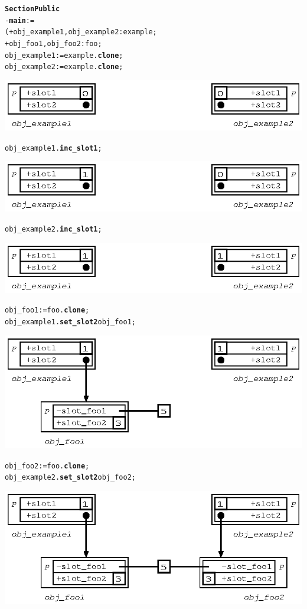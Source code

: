 \documentclass[11pt]{mybook}
\begin{document}
\begin{alltt}
{\bf{}Section Public}
  - {\bf{}main} := 
  ( + obj_example1,obj_example2:{\sc{}example};
    + obj_foo1,obj_foo2:{\sc{}foo};
    obj_example1 := {\sc{}example}.{\bf{}clone};
    obj_example2 := {\sc{}example}.{\bf{}clone};
\begin{center}
\includegraphics[scale=1.0]{figures/non_shared_slot3}
\end{center}
    obj_example1.{\bf{}inc\_slot1};
\begin{center}
\includegraphics[scale=1.0]{figures/non_shared_slot4}
\end{center}
   obj_example2.{\bf{}inc\_slot1};
\begin{center}
\includegraphics[scale=1.0]{figures/non_shared_slot5}
\end{center}
   obj_foo1 := {\sc{}foo}.{\bf{}clone};
   obj_example1.{\bf{}set\_slot2} obj_foo1;
\begin{center}
\includegraphics[scale=1.0]{figures/non_shared_slot6}
\end{center}
   obj_foo2 := {\sc{}foo}.{\bf{}clone};
   obj_example2.{\bf{}set\_slot2} obj_foo2;
\begin{center}
\includegraphics[scale=1.0]{figures/non_shared_slot7}
\end{center}

\end{alltt}
\end{document}
